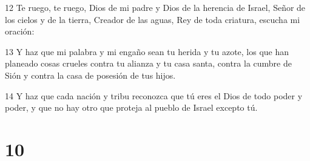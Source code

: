\par 12 Te ruego, te ruego, Dios de mi padre y Dios de la herencia de Israel, Señor de los cielos y de la tierra, Creador de las aguas, Rey de toda criatura, escucha mi oración:
\par 13 Y haz que mi palabra y mi engaño sean tu herida y tu azote, los que han planeado cosas crueles contra tu alianza y tu casa santa, contra la cumbre de Sión y contra la casa de posesión de tus hijos.
\par 14 Y haz que cada nación y tribu reconozca que tú eres el Dios de todo poder y poder, y que no hay otro que proteja al pueblo de Israel excepto tú.

\chapter{10}

